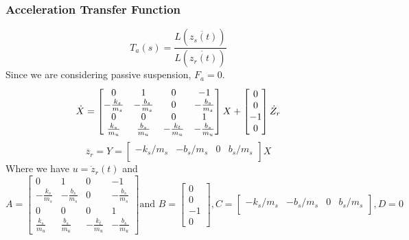 \documentclass[12pt, a4paper, oneside]{report}
\begin{document}
\subsubsection{Acceleration Transfer Function}
    \begin{equation}
        T_a(s) = \frac{L(\ddot{z_s(t)})}{L(\dot{z_r(t)})}
    \end{equation}
    Since we are considering passive suspension, $F_a = 0$.
    \begin{equation}
        \dot X = \begin{bmatrix}
            0 & 1 & 0 & -1 \\
            -\frac{k_s}{m_s} & -\frac{b_s}{m_s} & 0 & -\frac{b_s}{m_s} \\
            0 & 0 & 0 & 1 \\
            \frac{k_s}{m_u} & \frac{b_s}{m_u} & -\frac{k_t}{m_u} & -\frac{b_s}{m_u} 
        \end{bmatrix}
        X + \begin{bmatrix}
            0 \\
            0 \\
            -1 \\
            0
        \end{bmatrix} \dot Z_r \\
    \end{equation}
    \begin{equation}
        \ddot{z_r} = Y = \begin{bmatrix}
            -k_s/m_s & -b_s/m_s & 0 & b_s/m_s \\
        \end{bmatrix} X
    \end{equation}
    Where we have $u = \dot z_r(t)$ and 
    \begin{equation}
            A = \begin{bmatrix}
                0 & 1 & 0 & -1 \\
                -\frac{k_s}{m_s} & -\frac{b_s}{m_s} & 0 & -\frac{b_s}{m_s} \\
                0 & 0 & 0 & 1 \\
                \frac{k_s}{m_u} & \frac{b_s}{m_u} & -\frac{k_t}{m_u} & -\frac{b_s}{m_u}
            \end{bmatrix} \text{and } B = \begin{bmatrix}
                0 \\
                0 \\
                -1 \\
                0
            \end{bmatrix} 
            ,C = \begin{bmatrix}
                -k_s/m_s & -b_s/m_s & 0 & b_s/m_s \\
            \end{bmatrix}
            ,D = 0
            \nonumber
    \end{equation}
\end{document}
